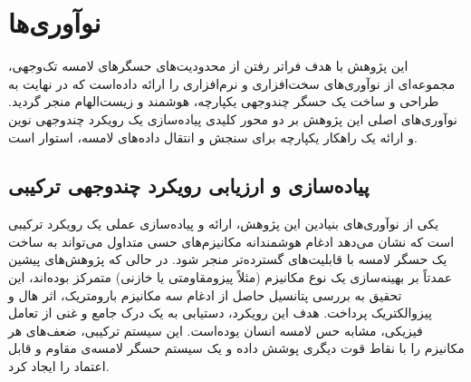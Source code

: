 \section{نوآوری‌ها}
این پژوهش با هدف فراتر رفتن از محدودیت‌های حسگرهای لامسه تک‌وجهی، مجموعه‌ای از نوآوری‌های سخت‌افزاری و نرم‌افزاری را ارائه داده‌است که در نهایت به طراحی و ساخت یک حسگر چندوجهی یکپارچه، هوشمند و زیست‌الهام منجر گردید. نوآوری‌های اصلی این پژوهش بر دو محور کلیدی پیاده‌سازی یک رویکرد چندوجهی نوین و ارائه یک راهکار یکپارچه برای سنجش و انتقال داده‌های لامسه، استوار است.
\subsection{پیاده‌سازی و ارزیابی رویکرد چندوجهی ترکیبی}

یکی از نوآوری‌های بنیادین این پژوهش، ارائه و پیاده‌سازی عملی یک رویکرد ترکیبی است که نشان می‌دهد ادغام هوشمندانه مکانیزم‌های حسی متداول می‌تواند به ساخت یک حسگر لامسه با قابلیت‌های گسترده‌تر منجر شود. در حالی که پژوهش‌های پیشین عمدتاً بر بهینه‌سازی یک نوع مکانیزم (مثلاً پیزومقاومتی یا خازنی) متمرکز بوده‌اند، این تحقیق به بررسی پتانسیل حاصل از ادغام سه مکانیزم بارومتریک، اثر هال و پیزوالکتریک پرداخت.
هدف این رویکرد، دستیابی به یک درک جامع و غنی از تعامل فیزیکی، مشابه حس لامسه انسان یوده‌است. این سیستم ترکیبی، ضعف‌های هر مکانیزم را با نقاط قوت دیگری پوشش داده و یک سیستم حسگر لامسه‌ی مقاوم و قابل اعتماد را ایجاد کرد.
